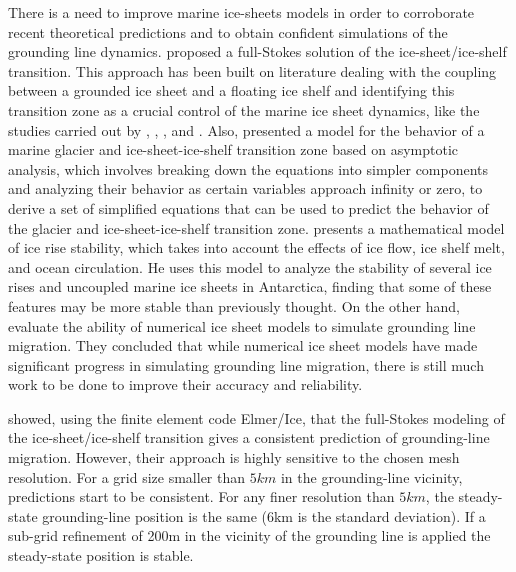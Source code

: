 \documentclass{article}
\begin{document}
There is a need to improve marine ice-sheets models in order to corroborate recent theoretical predictions and to obtain confident simulations of the grounding line dynamics. \cite{durand2009marine} proposed a full-Stokes solution of the ice-sheet/ice-shelf transition. This approach has been built on literature dealing with the coupling between a grounded ice sheet and a floating ice shelf and identifying this transition zone as a crucial control of the marine ice sheet dynamics, like the studies carried out by \cite{weertman1974stability}, \cite{van1985response}, \cite{schoof2007ice}, and \cite{schoof2007marine}. Also, \cite{chugunov1996modelling} presented a model for the behavior of a marine glacier and ice-sheet-ice-shelf transition zone based on asymptotic analysis, which involves breaking down the equations into simpler components and analyzing their behavior as certain variables approach infinity or zero, to derive a set of simplified equations that can be used to predict the behavior of the glacier and ice-sheet-ice-shelf transition zone. \cite{hindmarsh1996stability} presents a mathematical model of ice rise stability, which takes into account the effects of ice flow, ice shelf melt, and ocean circulation. He uses this model to analyze the stability of several ice rises and uncoupled marine ice sheets in Antarctica, finding that some of these features may be more stable than previously thought. On the other hand, \cite{vieli2005assessing} evaluate the ability of numerical ice sheet models to simulate grounding line migration. They concluded that while numerical ice sheet models have made significant progress in simulating grounding line migration, there is still much work to be done to improve their accuracy and reliability.

\cite{durand2009full} showed, using the finite element code Elmer/Ice, that the full-Stokes modeling of the ice-sheet/ice-shelf transition gives a consistent prediction of grounding-line migration. However, their approach is highly sensitive to the chosen mesh resolution. For a grid size smaller than $5 km$ in the grounding-line vicinity, predictions start to be consistent. For any finer resolution than $5 km$, the steady-state grounding-line position is the same (6km is the standard deviation). If a sub-grid refinement of 200m in the vicinity of the grounding line is applied the steady-state position is stable.
\end{document}

